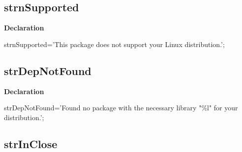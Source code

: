 \documentclass{report}
\newif\ifpdf
\begin{document}
\subsection*{strnSupported}
\fi
\label{trstrings-strnSupported}
\begin{list}{}{
\setlength{\itemindent}{0cm}
\setlength{\listparindent}{0cm}
\setlength{\leftmargin}{\evensidemargin}
\addtolength{\leftmargin}{\tmplength}
\settowidth{\labelsep}{X}
\addtolength{\leftmargin}{\labelsep}
\setlength{\labelwidth}{\tmplength}
}
\item[\textbf{Declaration}\hfill]
\ifpdf
\begin{flushleft}
\fi
\begin{ttfamily}
strnSupported='This package does not support your Linux distribution.';\end{ttfamily}

\ifpdf
\end{flushleft}
\fi

\end{list}
\ifpdf
\subsection*{\large{\textbf{strDepNotFound}}\normalsize\hspace{1ex}\hrulefill}
\else
\subsection*{strDepNotFound}
\fi
\label{trstrings-strDepNotFound}
\begin{list}{}{
\setlength{\itemindent}{0cm}
\setlength{\listparindent}{0cm}
\setlength{\leftmargin}{\evensidemargin}
\addtolength{\leftmargin}{\tmplength}
\settowidth{\labelsep}{X}
\addtolength{\leftmargin}{\labelsep}
\setlength{\labelwidth}{\tmplength}
}
\item[\textbf{Declaration}\hfill]
\ifpdf
\begin{flushleft}
\fi
\begin{ttfamily}
strDepNotFound='Found no package with the necessary library "{\%}l" for your distribution.';\end{ttfamily}

\ifpdf
\end{flushleft}
\fi

\end{list}
\ifpdf
\subsection*{\large{\textbf{strInClose}}\normalsize\hspace{1ex}\hrulefill}
\else
\end{document}
